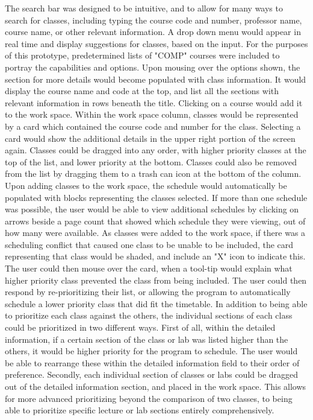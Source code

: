 \documentclass{article}
\begin{document}
\noindent
The search bar was designed to be intuitive, and to allow for many ways to search for classes, including typing the course code and number, professor name, course name, or other relevant information. A drop down menu would appear in real time and display suggestions for classes, based on the input. For the purposes of this prototype, predetermined lists of "COMP" courses were included to portray the capabilities and options. Upon mousing over the options shown, the section for more details would become populated with class information. It would display the course name and code at the top, and list all the sections with relevant information in rows beneath the title. Clicking on a course would add it to the work space.
\newline
\newline
Within the work space column, classes would be represented by a card which contained the course code and number for the class. Selecting a card would show the additional details in the upper right portion of the screen again. Classes could be dragged into any order, with higher priority classes at the top of the list, and lower priority at the bottom. Classes could also be removed from the list by dragging them to a trash can icon at the bottom of the column.
\newline
\newline
Upon adding classes to the work space, the schedule would automatically be populated with blocks representing the classes selected. If more than one schedule was possible, the user would be able to view additional schedules by clicking on arrows beside a page count that showed which schedule they were viewing, out of how many were available. As classes were added to the work space, if there was a scheduling conflict that caused one class to be unable to be included, the card representing that class would be shaded, and include an "X" icon to indicate this. The user could then mouse over the card, when a tool-tip would explain what higher priority class prevented the class from being included. The user could then respond by re-prioritizing their list, or allowing the program to automatically schedule a lower priority class that did fit the timetable.
\newline
\newline
In addition to being able to prioritize each class against the others, the individual sections of each class could be prioritized in two different ways. First of all, within the detailed information, if a certain section of the class or lab was listed higher than the others, it would be higher priority for the program to schedule. The user would be able to rearrange these within the detailed information field to their order of preference. Secondly, each individual section of classes or labs could be dragged out of the detailed information section, and placed in the work space. This allows for more advanced prioritizing beyond the comparison of two classes, to being able to prioritize specific lecture or lab sections entirely comprehensively.
\end{document}
